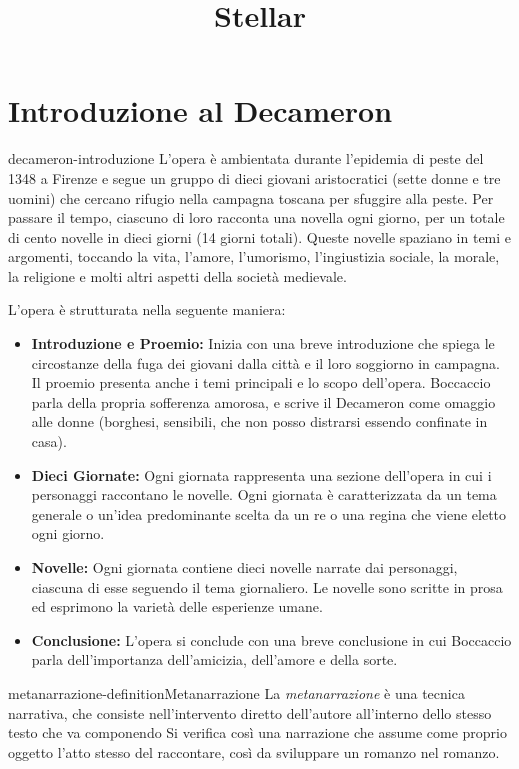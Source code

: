 \documentclass[preview]{standalone}
\begin{document}
\title{Stellar}
\genpage

\section{Introduzione al Decameron}

\begin{snippet}{decameron-introduzione}
    L'opera è ambientata durante l'epidemia di peste del 1348 a Firenze
    e segue un gruppo di dieci giovani aristocratici (sette donne e tre uomini)
    che cercano rifugio nella campagna toscana per sfuggire alla peste.
    Per passare il tempo, ciascuno di loro racconta una novella ogni giorno,
    per un totale di cento novelle in dieci giorni (14 giorni totali).
    Queste novelle spaziano in temi e argomenti, toccando la vita, l'amore, l'umorismo,
    l'ingiustizia sociale, la morale, la religione e molti altri aspetti della società medievale.
    
    L'opera è strutturata nella seguente maniera:
    \begin{itemize}
        \item \textbf{Introduzione e Proemio:} Inizia con una breve introduzione che spiega le circostanze della fuga dei giovani dalla città e il loro soggiorno in campagna. Il proemio presenta anche i temi principali e lo scopo dell'opera.
            Boccaccio parla della propria sofferenza amorosa, e scrive il Decameron come omaggio alle donne (borghesi, sensibili, che non posso distrarsi essendo confinate in casa).
        \item \textbf{Dieci Giornate:} Ogni giornata rappresenta una sezione dell'opera in cui i personaggi raccontano le novelle. Ogni giornata è caratterizzata da un tema generale o un'idea predominante scelta da un re o una regina che viene eletto ogni giorno.
        \item \textbf{Novelle:} Ogni giornata contiene dieci novelle narrate dai personaggi, ciascuna di esse seguendo il tema giornaliero. Le novelle sono scritte in prosa ed esprimono la varietà delle esperienze umane.
        \item \textbf{Conclusione:} L'opera si conclude con una breve conclusione in cui Boccaccio parla dell'importanza dell'amicizia, dell'amore e della sorte.
    \end{itemize}
\end{snippet}

\begin{snippetdefinition}{metanarrazione-definition}{Metanarrazione}
    La \textit{metanarrazione} è una tecnica narrativa,
    che consiste nell'intervento diretto dell'autore all'interno dello stesso testo che va componendo
    Si verifica così una narrazione che assume come proprio oggetto l'atto stesso del raccontare,
    così da sviluppare un romanzo nel romanzo.
\end{snippetdefinition}
\end{document}
